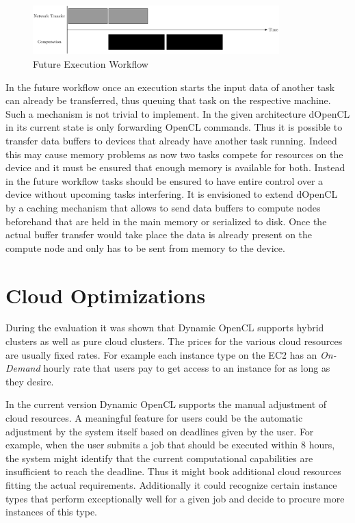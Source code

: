 \begin{figure}[!htb]	
	\includegraphics[width=0.85\textwidth]{drawings/active_queue.pdf}
	\centering
	\caption{Future Execution Workflow}
	\label{img:active_queueing}
\end{figure}

In the future workflow once an execution starts the input data of another task can already be transferred, thus queuing that task on the respective machine. Such a mechanism is not trivial to implement. In the given architecture dOpenCL in its current state is only forwarding OpenCL commands. Thus it is possible to transfer data buffers to devices that already have another task running. Indeed this may cause memory problems as now two tasks compete for resources on the device and it must be ensured that enough memory is available for both. Instead in the future workflow tasks should be ensured to have entire control over a device without upcoming tasks interfering. It is envisioned to extend dOpenCL by a caching mechanism that allows to send data buffers to compute nodes beforehand that are held in the main memory or serialized to disk. Once the actual buffer transfer would take place the data is already present on the compute node and only has to be sent from memory to the device.

\section*{Cloud Optimizations}

During the evaluation it was shown that Dynamic OpenCL supports hybrid clusters as well as pure cloud clusters. The prices for the various cloud resources are usually fixed rates. For example each instance type on the EC2 has an \textit{On-Demand} hourly rate that users pay to get access to an instance for as long as they desire. 

In the current version Dynamic OpenCL supports the manual adjustment of cloud resources. A meaningful feature for users could be the automatic adjustment by the system itself based on deadlines given by the user. For example, when the user submits a job that should be executed within 8 hours, the system might identify that the current computational capabilities are insufficient to reach the deadline. Thus it might book additional cloud resources fitting the actual requirements. Additionally it could recognize certain instance types that perform exceptionally well for a given job and decide to procure more instances of this type.

